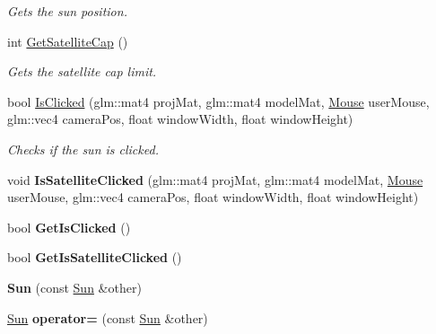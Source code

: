 \begin{DoxyCompactItemize}
\begin{DoxyCompactList}\small\item\em Gets the sun position. \end{DoxyCompactList}\item 
\hypertarget{class_sun_a703c794dafe926c6c41f8d8ee3f6c5a2}{int \hyperlink{class_sun_a703c794dafe926c6c41f8d8ee3f6c5a2}{Get\-Satellite\-Cap} ()}\label{class_sun_a703c794dafe926c6c41f8d8ee3f6c5a2}

\begin{DoxyCompactList}\small\item\em Gets the satellite cap limit. \end{DoxyCompactList}\item 
bool \hyperlink{class_sun_a07ac47d10ff08b43c74de2b704d0ba5a}{Is\-Clicked} (glm\-::mat4 proj\-Mat, glm\-::mat4 model\-Mat, \hyperlink{class_mouse}{Mouse} user\-Mouse, glm\-::vec4 camera\-Pos, float window\-Width, float window\-Height)
\begin{DoxyCompactList}\small\item\em Checks if the sun is clicked. \end{DoxyCompactList}\item 
\hypertarget{class_sun_a5808caa1b90e6a743df2df5ecb9f9850}{void {\bfseries Is\-Satellite\-Clicked} (glm\-::mat4 proj\-Mat, glm\-::mat4 model\-Mat, \hyperlink{class_mouse}{Mouse} user\-Mouse, glm\-::vec4 camera\-Pos, float window\-Width, float window\-Height)}\label{class_sun_a5808caa1b90e6a743df2df5ecb9f9850}

\item 
\hypertarget{class_sun_acf957de19b8643f8282032a4aca00929}{bool {\bfseries Get\-Is\-Clicked} ()}\label{class_sun_acf957de19b8643f8282032a4aca00929}

\item 
\hypertarget{class_sun_a4bff32ca0569f5ba612faf4ffd946228}{bool {\bfseries Get\-Is\-Satellite\-Clicked} ()}\label{class_sun_a4bff32ca0569f5ba612faf4ffd946228}

\item 
\hypertarget{class_sun_a3f7d32a340ac92de0b49b1a804159431}{{\bfseries Sun} (const \hyperlink{class_sun}{Sun} \&other)}\label{class_sun_a3f7d32a340ac92de0b49b1a804159431}

\item 
\hypertarget{class_sun_a511e97ba6dbf11d67f2c7e611626e312}{\hyperlink{class_sun}{Sun} {\bfseries operator=} (const \hyperlink{class_sun}{Sun} \&other)}\label{class_sun_a511e97ba6dbf11d67f2c7e611626e312}

\end{DoxyCompactItemize}
